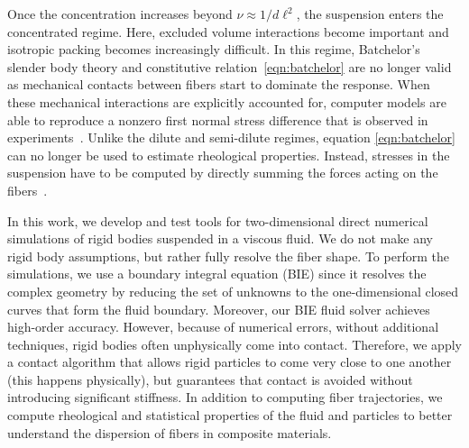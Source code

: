 \documentclass[preprint, 10pt]{elsarticle}
\begin{document}
Once the concentration increases beyond $\nu \approx 1/d\ell^2$, the
suspension enters the concentrated regime. Here, excluded volume
interactions become important and isotropic packing becomes increasingly
difficult. In this regime, Batchelor's slender body theory and
constitutive relation~\eqref{eqn:batchelor} are no longer valid as
mechanical contacts between fibers start to dominate the response. When
these mechanical interactions are explicitly accounted for, computer
models are able to reproduce a nonzero first normal stress difference
that is observed in experiments~\cite{Sundararajakumar1997, Ausias2006,
Lindstroem2008}. Unlike the dilute and semi-dilute regimes, equation
\eqref{eqn:batchelor} can no longer be used to estimate rheological
properties. Instead, stresses in the suspension have to be computed by
directly summing the forces acting on the fibers~\cite{Ausias2006,
Lindstroem2008}.

In this work, we develop and test tools for two-dimensional direct
numerical simulations of rigid bodies suspended in a viscous fluid.  We
do not make any rigid body assumptions, but rather fully resolve the
fiber shape.  To perform the simulations, we use a boundary integral
equation (BIE) since it resolves the complex geometry by reducing the
set of unknowns to the one-dimensional closed curves that form the fluid
boundary.  Moreover, our BIE fluid solver achieves high-order accuracy.
However, because of numerical errors, without additional techniques,
rigid bodies often unphysically come into contact.  Therefore, we apply
a contact algorithm that allows rigid particles to come very close to
one another (this happens physically), but guarantees that contact is
avoided without introducing significant stiffness.  In addition to
computing fiber trajectories, we compute rheological and statistical
properties of the fluid and particles to better understand the
dispersion of fibers in composite materials.
\end{document}
